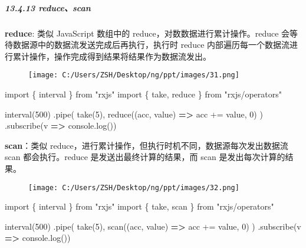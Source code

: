 \documentclass[
]{article}
\newenvironment{Shaded}{}{}
\newcommand{\BuiltInTok}[1]{#1}
\newcommand{\DecValTok}[1]{\textcolor[rgb]{0.25,0.63,0.44}{#1}}
\newcommand{\FunctionTok}[1]{\textcolor[rgb]{0.02,0.16,0.49}{#1}}
\newcommand{\ImportTok}[1]{#1}
\newcommand{\KeywordTok}[1]{\textcolor[rgb]{0.00,0.44,0.13}{\textbf{#1}}}
\newcommand{\NormalTok}[1]{#1}
\newcommand{\OperatorTok}[1]{\textcolor[rgb]{0.40,0.40,0.40}{#1}}
\newcommand{\StringTok}[1]{\textcolor[rgb]{0.25,0.44,0.63}{#1}}
\begin{document}
\hypertarget{13413-reducescan}{%
\subparagraph{13.4.13 reduce、scan}\label{13413-reducescan}}

\textbf{reduce}: 类似 JavaScript 数组中的
reduce，对数数据进行累计操作。reduce
会等待数据源中的数据流发送完成后再执行，执行时 reduce
内部遍历每一个数据流进行累计操作，操作完成得到结果将结果作为数据流发出。

\begin{figure}
\centering
\texttt{[image: C:/Users/ZSH/Desktop/ng/ppt/images/31.png]}
\caption{}
\end{figure}

\begin{Shaded}
\begin{Highlighting}[]
\ImportTok{import}\NormalTok{ \{ interval \} }\ImportTok{from} \StringTok{"rxjs"}
\ImportTok{import}\NormalTok{ \{ take}\OperatorTok{,}\NormalTok{ reduce \} }\ImportTok{from} \StringTok{"rxjs/operators"}

\FunctionTok{interval}\NormalTok{(}\DecValTok{500}\NormalTok{)}
  \OperatorTok{.}\FunctionTok{pipe}\NormalTok{(}
    \FunctionTok{take}\NormalTok{(}\DecValTok{5}\NormalTok{)}\OperatorTok{,}
    \FunctionTok{reduce}\NormalTok{((acc}\OperatorTok{,}\NormalTok{ value) }\KeywordTok{=\textgreater{}}\NormalTok{ acc }\OperatorTok{+=}\NormalTok{ value}\OperatorTok{,} \DecValTok{0}\NormalTok{)}
\NormalTok{  )}
  \OperatorTok{.}\FunctionTok{subscribe}\NormalTok{(v }\KeywordTok{=\textgreater{}} \BuiltInTok{console}\OperatorTok{.}\FunctionTok{log}\NormalTok{())}
\end{Highlighting}
\end{Shaded}

\textbf{scan}：类似
reduce，进行累计操作，但执行时机不同，数据源每次发出数据流 scan
都会执行。reduce 是发送出最终计算的结果，而 scan 是发出每次计算的结果。

\begin{figure}
\centering
\texttt{[image: C:/Users/ZSH/Desktop/ng/ppt/images/32.png]}
\caption{}
\end{figure}

\begin{Shaded}
\begin{Highlighting}[]
\ImportTok{import}\NormalTok{ \{ interval \} }\ImportTok{from} \StringTok{"rxjs"}
\ImportTok{import}\NormalTok{ \{ take}\OperatorTok{,}\NormalTok{ scan \} }\ImportTok{from} \StringTok{"rxjs/operators"}

\FunctionTok{interval}\NormalTok{(}\DecValTok{500}\NormalTok{)}
  \OperatorTok{.}\FunctionTok{pipe}\NormalTok{(}
    \FunctionTok{take}\NormalTok{(}\DecValTok{5}\NormalTok{)}\OperatorTok{,}
    \FunctionTok{scan}\NormalTok{((acc}\OperatorTok{,}\NormalTok{ value) }\KeywordTok{=\textgreater{}}\NormalTok{ acc }\OperatorTok{+=}\NormalTok{ value}\OperatorTok{,} \DecValTok{0}\NormalTok{)}
\NormalTok{  )}
  \OperatorTok{.}\FunctionTok{subscribe}\NormalTok{(v }\KeywordTok{=\textgreater{}} \BuiltInTok{console}\OperatorTok{.}\FunctionTok{log}\NormalTok{())}
\end{Highlighting}
\end{Shaded}
\end{document}
